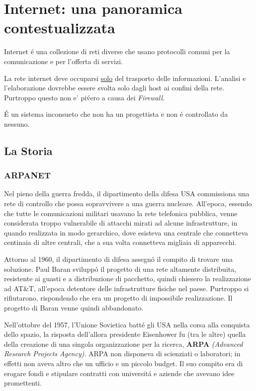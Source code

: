 \documentclass[12pt]{article}
\begin{document}
\clearpage
\section{Internet: una panoramica contestualizzata}\label{internet-una-panoramica-contestualizzata}
Internet \'e una collezione di reti diverse che usano protocolli comuni per la comunicazione e per l'offerta di servizi. 

La rete internet deve occuparsi \underline{solo} del trasporto delle informazioni. L'analisi e l'elaborazione dovrebbe essere svolta 
solo dagli host ai confini della rete. Purtroppo questo non e' pi\' vero a causa dei \textit{Firewall}.

\'E un sistema inconsueto che non ha un progettista e non \'e controllato da nessuno. 

\subsection{La Storia}\label{la-storia-di-internet}
\subsubsection{ARPANET}\label{arpanet}
Nel pieno della guerra fredda, il dipartimento della difesa USA commissiona una rete di controllo che possa sopravvivere 
a una guerra nucleare. All'epoca, essendo che tutte le comunicazioni militari usavano la rete telefonica pubblica, venne 
considerata troppo vulnerabile di attacchi mirati ad alcune infrastrutture, in quando realizzata in modo gerarchico, dove
esisteva una centrale che connetteva centinaia di altre centrali, che a sua volta connetteva migliaia di apparecchi.

Attorno al 1960, il dipartimento di difesa assegn\'o il compito di trovare una soluzione. Paul Baran svilupp\'o il progetto
di una rete altamente distribuita, resistente ai guasti e a distribuzione di pacchetto, quindi chiesero la realizzazione 
ad AT\&T, all'epoca detentore delle infrastrutture fisiche nel paese. Purtroppo si rifiutarono, rispondendo che era un progetto 
di impossibile realizzazione. Il progetto di Baran venne quindi abbandonato.

Nell'ottobre del 1957, l'Unione Sovietica batt\'e gli USA nella corsa alla conquista dello spazio, la risposta 
dell'allora presidente Eisenhower fu (tra le altre) quella della creazione di una singola organizzazione per la 
ricerca, \textbf{ARPA} \textit{(Advanced Research Projects Agency)}. ARPA non disponeva di scienziati o laboratori; in 
effetti non aveva altro che un ufficio e un piccolo budget. Il suo compito era di erogare fondi e stipulare contratti con 
universit\'a e aziende che avevano idee promettenti. 
\end{document}
